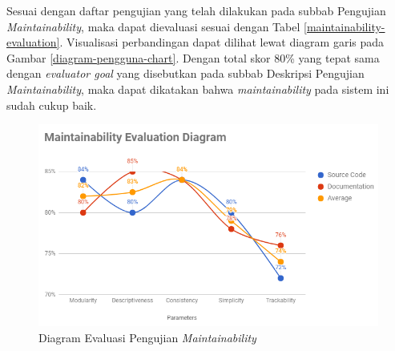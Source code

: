 Sesuai dengan daftar pengujian yang telah dilakukan pada subbab Pengujian \textit{Maintainability}, maka dapat dievaluasi sesuai dengan Tabel \ref{maintainability-evaluation}. Visualisasi perbandingan dapat dilihat lewat diagram garis pada Gambar \ref{diagram-pengguna-chart}. Dengan total skor 80\% yang tepat sama dengan \textit{evaluator goal} yang disebutkan pada subbab Deskripsi Pengujian \textit{Maintainability}, maka dapat dikatakan bahwa \textit{maintainability} pada sistem ini sudah cukup baik.


\begin{figure}[h]
	\centering
	\includegraphics[width=\textwidth]{images/bab5/maintainability/maintainability-evaluation.png}
	\caption{Diagram Evaluasi Pengujian \textit{Maintainability}}
	\label{maintainability-diagram}
\end{figure}

\newpage